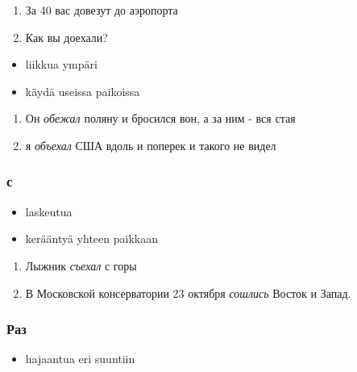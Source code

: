 \documentclass[]{scrartcl}
\providecommand{\tightlist}{%
  \setlength{\itemsep}{0pt}\setlength{\parskip}{0pt}}
\begin{document}
\begin{enumerate}
\def\labelenumi{(\arabic{enumi})}
\setcounter{enumi}{437}
\tightlist
\item
  За 40 вас довезут до аэропорта
\item
  Как вы доехали?
\end{enumerate}


\begin{itemize}
\tightlist
\item
  liikkua ympäri
\item
  käydä useissa paikoissa
\end{itemize}

\begin{enumerate}
\def\labelenumi{(\arabic{enumi})}
\setcounter{enumi}{439}
\tightlist
\item
  Он \emph{обежал} поляну и бросился вон, а за ним - вся стая
\item
  я \emph{объехал} США вдоль и поперек и такого не видел
\end{enumerate}

\subsubsection{с}\label{ux441}

\begin{itemize}
\tightlist
\item
  laskeutua
\item
  kerääntyä yhteen paikkaan
\end{itemize}

\begin{enumerate}
\def\labelenumi{(\arabic{enumi})}
\setcounter{enumi}{441}
\tightlist
\item
  Лыжник \emph{съехал} с горы
\item
  В Московской консерватории 23 октября \emph{сошлись} Восток и Запад.
\end{enumerate}

\subsubsection{Раз}\label{ux440ux430ux437}

\begin{itemize}
\tightlist
\item
  hajaantua eri suuntiin
\end{itemize}
\end{document}
